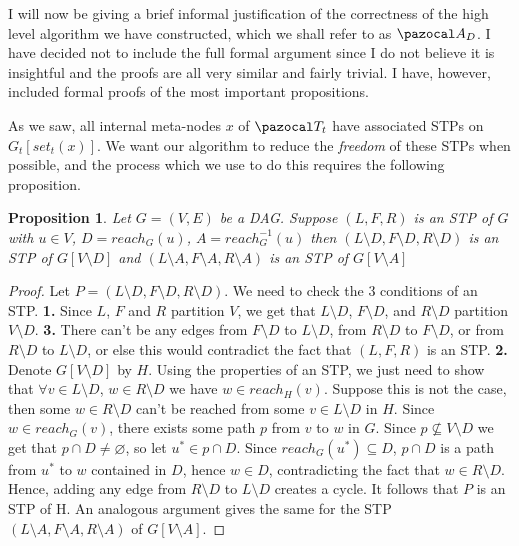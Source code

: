 \documentclass{report}
\newtheorem{proposition}[theorem]{Proposition}
\begin{document}
I will now be giving a brief informal justification of the correctness of the high level algorithm we have constructed, which we shall refer to as $\pazocal A_D$. I have decided not to include the full formal argument since I do not believe it is insightful and the proofs are all very similar and fairly trivial. I have, however, included formal proofs of the most important propositions.

As we saw, all internal meta-nodes $x$ of $\pazocal T_t$ have associated STPs on $G_t[set_t(x)]$. We want our algorithm to reduce the \textit{freedom} of these STPs when possible, and the process which we use to do this requires the following proposition.

\begin{proposition}
Let $G=(V,E)$ be a DAG. Suppose $(L,F,R)$ is an STP of $G$ with $u \in V$, $D=reach_{G}(u)$, $A=reach_{G}^{-1}(u)$ then $(L\setminus D,F\setminus D,R\setminus D)$ is an STP of $G[V\setminus D]$ and $(L\setminus A,F\setminus A,R\setminus A)$ is an STP of $G[V\setminus A]$
\end{proposition}

\begin{proof}
Let $P=(L\setminus D,F\setminus D,R\setminus D)$. We need to check the 3 conditions of an STP. \textbf{1.} Since $L$, $F$ and $R$ partition $V$, we get that $L\setminus D$, $F\setminus D$, and $R\setminus D$ partition $V\setminus D$. \textbf{3.} There can't be any edges from $F\setminus D$ to $L\setminus D$, from $R\setminus D$ to $F\setminus D$, or from $R\setminus D$ to $L\setminus D$, or else this would contradict the fact that $(L,F,R)$ is an STP. \textbf{2.} Denote $G[V\setminus D]$ by $H$. Using the properties of an STP, we just need to show that $\forall v \in L \setminus D$, $w \in R \setminus D$ we have $w \in reach_{H}(v)$. Suppose this is not the case, then some $w \in R \setminus D$ can't be reached from some $v \in L \setminus D$ in $H$. Since $w \in reach_{G}(v)$, there exists some path $p$ from $v$ to $w$ in $G$. Since $p \nsubseteq V \setminus D$ we get that $p \cap D \neq \varnothing$, so let $u^{*} \in p \cap D$. Since $reach_{G}(u^{*}) \subseteq D$, $p \cap D$ is a path from $u^{*}$ to $w$ contained in $D$, hence $w \in D$, contradicting the fact that $w \in R \setminus D$. Hence, adding any edge from $R \setminus D$ to $L \setminus D$ creates a cycle. It follows that $P$ is an STP of H. An analogous argument gives the same for the STP $(L\setminus A,F\setminus A,R\setminus A)$ of $G[V\setminus A]$.
\end{proof}
\end{document}
